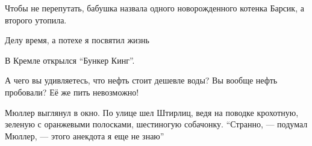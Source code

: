 Чтобы не перепутать, бабушка назвала одного новорожденного котенка Барсик, а второго утопила.


\bigbreak

Делу время, а потехе я посвятил жизнь

\bigbreak

В Кремле открылся ``Бункер Кинг''.

\bigbreak

А чего вы удивляетесь, что нефть стоит дешевле воды? 
Вы вообще нефть пробовали?
Её же пить невозможно!

\bigbreak

Мюллер выглянул в окно. По улице шел Штирлиц, ведя на поводке крохотную, зеленую с оранжевыми полосками, шестиногую собачонку. ``Странно, --- подумал Мюллер, --- этого анекдота я еще не знаю''